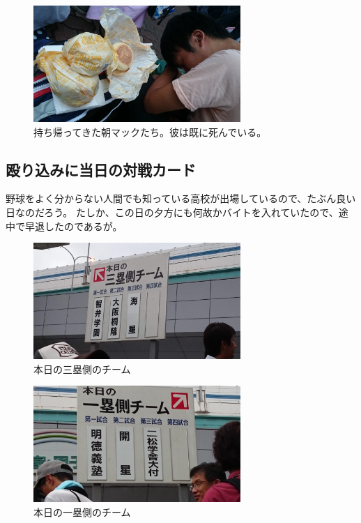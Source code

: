 \begin{figure}[h]
\centering
\includegraphics[width=0.7\textwidth]{./section/Shokuji/figures/Koushien_breakfast.jpg}
  \caption{持ち帰ってきた朝マックたち。彼は既に死んでいる。}
\label{Fig:Seiza}
\end{figure}


\subsection{殴り込みに当日の対戦カード}
野球をよく分からない人間でも知っている高校が出場しているので、たぶん良い日なのだろう。
たしか、この日の夕方にも何故かバイトを入れていたので、途中で早退したのであるが。

\begin{figure}[h]
\centering
\includegraphics[width=0.7\textwidth]{./section/Shokuji/figures/Koushien_2.jpg}
  \caption{本日の三塁側のチーム}
\label{Fig:Seiza}
\end{figure}

\begin{figure}[h]
\centering
\includegraphics[width=0.7\textwidth]{./section/Shokuji/figures/Koushien_3.jpg}
  \caption{本日の一塁側のチーム}
\label{Fig:Seiza}
\end{figure}

